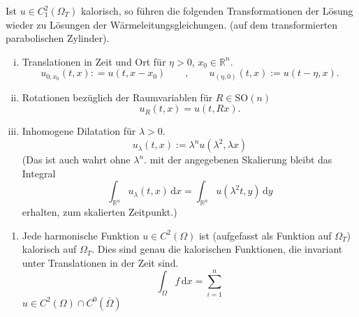 \begin{bemerkung}
	Ist $u \in C_1^2(\Omega_T)$ kalorisch, so führen die folgenden Transformationen der Lösung wieder zu Lösungen der Wärmeleitungsgleichungen. 
	(auf dem transformierten parabolischen Zylinder). 
	\begin{enumerate}[(i)]
		\item Translationen in Zeit und Ort für $\eta >0$, $x_0 \in \mathbb{R}^n$.
		\[
			u_{0,x_0}(t,x): = u(t,x-x_0) \qquad , \qquad u_{(\eta,0)}(t,x) := u(t-\eta,x).
		\]
		\item Rotationen bezüglich der Raumvariablen für $R \in \text{SO}(n)$
		\[
			u_R(t,x) = u(t,Rx).
		\]
		\item Inhomogene Dilatation für $\lambda >0$.
		\[
			u_{\lambda}(t,x) := \lambda^n u ( \lambda^2, \lambda x)
		\]
		(Das ist auch wahrt ohne $\lambda^n$. mit der angegebenen Skalierung bleibt das Integral
		\[
			\int_{\mathbb{R}^n}^{} u _{\lambda}(t,x) \,\mathrm{d}x = \int_{\mathbb{R}^n}^{} u(\lambda^2t,y) \,\mathrm{d}y
		\] erhalten, zum skalierten Zeitpunkt.)
	\end{enumerate}
\end{bemerkung}

\begin{beispiele}
	\begin{enumerate}[1)]
		\item Jede harmonische Funktion $u \in C^2(\Omega)$ ist (aufgefasst als Funktion auf $\Omega_T$) kalorisch auf $\Omega_T$. 
		Dies sind genau die kalorischen Funktionen, die invariant unter Translationen in der Zeit sind.
		\[
			\int_{\Omega}^{}f \,\mathrm{d}x = \sum^{n}_{i=1} 
		\]
		$u \in C^2(\Omega) \cap C^0(\bar{\Omega})$
	\end{enumerate}
\end{beispiele}
